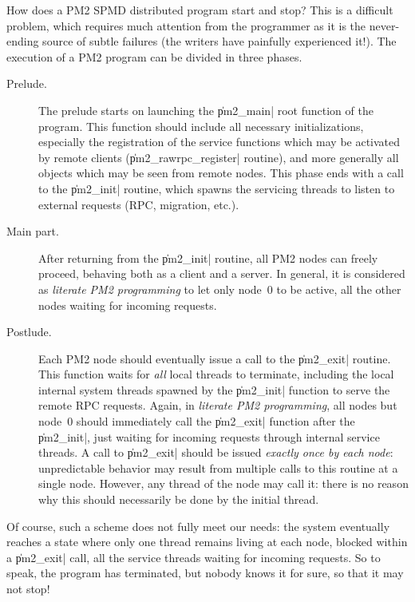 How does a PM2 SPMD distributed program start and stop? This is a
difficult problem, which requires much attention from the programmer
as it is the never-ending source of subtle failures (the writers have
painfully experienced it!). The execution of a PM2 program can be
divided in three phases.
\begin{description}
  
\item[Prelude.] The prelude starts on launching the \|pm2_main| root
  function of the program. This function should include all necessary
  initializations, especially the registration of the service
  functions which may be activated by remote clients
  (\|pm2_rawrpc_register| routine), and more generally all objects
  which may be seen from remote nodes. This phase ends with a call to
  the \|pm2_init| routine, which spawns the servicing threads to
  listen to external requests (RPC, migration, etc.).
  
\item[Main part.] After returning from the \|pm2_init| routine, all
  PM2 nodes can freely proceed, behaving both as a client and a
  server. In general, it is considered as \emph{literate PM2
    programming} to let only node~0 to be active, all the other nodes
  waiting for incoming requests.
  
\item[Postlude.] Each PM2 node should eventually issue a call to the
  \|pm2_exit| routine. This function waits for \emph{all} local
  threads to terminate, including the local internal system threads
  spawned by the \|pm2_init| function to serve the remote RPC
  requests.  Again, in \emph{literate PM2 programming}, all nodes but
  node~0 should immediately call the \|pm2_exit| function after the
  \|pm2_init|, just waiting for incoming requests through internal
  service threads. A call to \|pm2_exit| should be issued
  \emph{exactly once by each node}: unpredictable behavior may result
  from multiple calls to this routine at a single node. However, any
  thread of the node may call it: there is no reason why this should
  necessarily be done by the initial thread.

\end{description}
Of course, such a scheme does not fully meet our needs: the system
eventually reaches a state where only one thread remains living at
each node, blocked within a \|pm2_exit| call, all the service threads
waiting for incoming requests. So to speak, the program has
terminated, but nobody knows it for sure, so that it may not stop!

